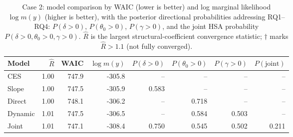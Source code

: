 \begin{table}[H]\centering\small
\caption{Case 2: model comparison by WAIC (lower is better) and log marginal likelihood $\log m(y)$ (higher is better), with the posterior directional probabilities addressing RQ1--RQ4: $P(\delta>0)$, $P(\theta_0>0)$, $P(\gamma>0)$, and the joint HSA probability $P(\delta>0,\theta_0>0,\gamma>0)$. $\hat R$ is the largest structural-coefficient convergence statistic; $\dagger$ marks $\hat R>1.1$ (not fully converged).}
\label{tab:case2_cmp}
\begin{tabular}{lrrrrrrr}\toprule
Model & $\hat R$ & WAIC & $\log m(y)$ & $P(\delta{>}0)$ & $P(\theta_0{>}0)$ & $P(\gamma{>}0)$ & $P(\text{joint})$ \\\midrule
CES & 1.00 & 747.9 & -305.8 & -- & -- & -- & -- \\
Slope & 1.00 & 747.5 & -305.9 & 0.583 & -- & -- & -- \\
Direct & 1.00 & 748.1 & -306.2 & -- & 0.718 & -- & -- \\
Dynamic & 1.01 & 747.5 & -306.5 & -- & 0.584 & 0.503 & -- \\
Joint & 1.01 & 747.1 & -308.4 & 0.750 & 0.545 & 0.502 & 0.211 \\
\bottomrule\end{tabular}\end{table}

